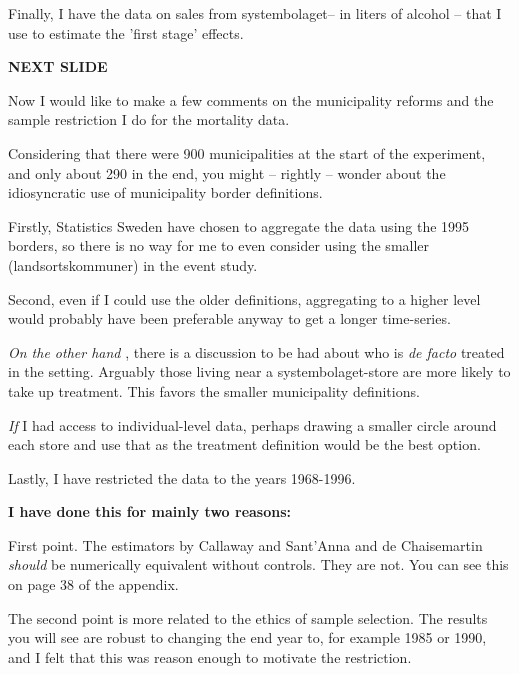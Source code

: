 \documentclass[12pt]{article}
\begin{document}
Finally, I have the data on sales from systembolaget-- in liters of alcohol -- that I use to estimate the 'first stage' effects.

 \textbf{NEXT SLIDE}

 Now I would like to make a few comments on the municipality reforms and the sample restriction I do for the mortality data. 

 Considering that there were 900 municipalities at the start of the experiment, and only about 290 in the end, you might -- rightly -- wonder about the idiosyncratic use of municipality border definitions. 

Firstly, Statistics Sweden have chosen to aggregate the data using the 1995 borders, so there is no way for me to even consider using the smaller (landsortskommuner) in the event study. 

Second, even if I could use the older definitions, aggregating to a higher level would probably have been preferable anyway to get a longer time-series. 

\emph{On the other hand} , there is a discussion to be had about who is \emph{de facto}  treated in the setting. Arguably those living near a systembolaget-store are more likely to take up treatment. This favors the smaller municipality definitions. 

\emph{If}  I had access to individual-level data, perhaps drawing a smaller circle around each store and use that as the treatment definition would be the best option.

Lastly, I have restricted the data to the years 1968-1996. 

 \textbf{I have done this for mainly two reasons:} 

First point. The estimators by Callaway and Sant'Anna and de Chaisemartin \emph{should} be numerically equivalent without controls. They are not. You can see this on page 38 of the appendix.


The second point is more related to the ethics of sample selection.  The results you will see are robust to changing the end year to, for example 1985 or 1990, and I felt that this was reason enough to motivate the restriction. 
\end{document}
